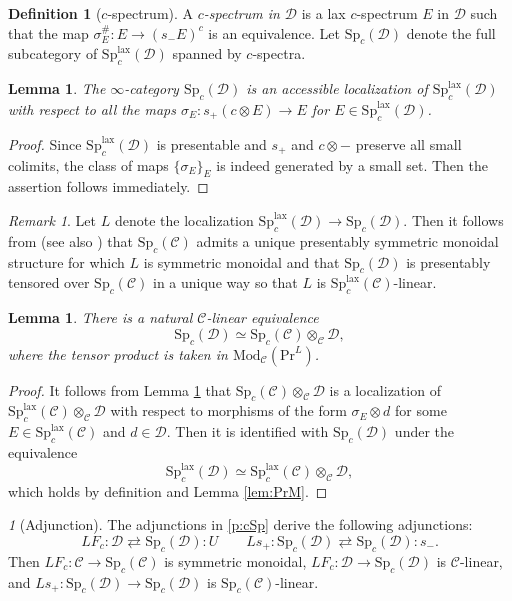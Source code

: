 \documentclass{amsart}
\theoremstyle{plain}
\newtheorem{lemma}[theorem]{Lemma}
\theoremstyle{definition}
\newtheorem{definition}[theorem]{Definition}
\theoremstyle{remark}
\newtheorem{remark}[theorem]{Remark}
\newtheorem{p}[theorem]{}
\numberwithin{equation}{theorem}
\newcommand{\mcal}[1]{\mathcal{#1}}
\newcommand{\Mod}{\mathrm{Mod}}
\renewcommand{\Pr}{\mathrm{Pr}}
\newcommand{\Sp}{\mathrm{Sp}}
\newcommand{\lax}{\mathrm{lax}}
\begin{document}
\begin{definition}[$c$-spectrum]\label{def:cSp2}
A \textit{$c$-spectrum in $\mcal{D}$} is a lax $c$-spectrum $E$ in $\mcal{D}$ such that the map $\sigma^\#_E\colon E\to(s_-E)^c$ is an equivalence.
Let $\Sp_c(\mcal{D})$ denote the full subcategory of $\Sp^\lax_c(\mcal{D})$ spanned by $c$-spectra.
\end{definition}

\begin{lemma}\label{lem:cSp3}
The $\infty$-category $\Sp_c(\mcal{D})$ is an accessible localization of $\Sp^\lax_c(\mcal{D})$ with respect to all the maps $\sigma_E\colon s_+(c\otimes E)\to E$ for $E\in\Sp^\lax_c(\mcal{D})$.
\end{lemma}
\begin{proof}
Since $\Sp^\lax_c(\mcal{D})$ is presentable and $s_+$ and $c\otimes-$ preserve all small colimits, the class of maps $\{\sigma_E\}_E$ is indeed generated by a small set.
Then the assertion follows immediately.
\end{proof}

\begin{remark}
Let $L$ denote the localization $\Sp^\lax_c(\mcal{D})\to\Sp_c(\mcal{D})$.
Then it follows from \cite[2.2.1.9]{HA} (see also \cite[4.1.7.4]{HA}) that $\Sp_c(\mcal{C})$ admits a unique presentably symmetric monoidal structure for which $L$ is symmetric monoidal and that $\Sp_c(\mcal{D})$ is presentably tensored over $\Sp_c(\mcal{C})$ in a unique way so that $L$ is $\Sp^\lax_c(\mcal{C})$-linear. 
\end{remark}

\begin{lemma}\label{lem:cSp+}
There is a natural $\mcal{C}$-linear equivalence
\[
	\Sp_c(\mcal{D}) \simeq \Sp_c(\mcal{C})\otimes_\mcal{C}\mcal{D},
\]
where the tensor product is taken in $\Mod_\mcal{C}(\Pr^L)$.
\end{lemma}
\begin{proof}
It follows from Lemma \ref{lem:cSp3} that $\Sp_c(\mcal{C})\otimes_\mcal{C}\mcal{D}$ is a localization of $\Sp^\lax_c(\mcal{C})\otimes_\mcal{C}\mcal{D}$ with respect to morphisms of the form $\sigma_E\otimes d$ for some $E\in\Sp^\lax_c(\mcal{C})$ and $d\in\mcal{D}$.
Then it is identified with $\Sp_c(\mcal{D})$ under the equivalence
\[
	\Sp^\lax_c(\mcal{D}) \simeq \Sp^\lax_c(\mcal{C})\otimes_\mcal{C}\mcal{D},
\]
which holds by definition and Lemma \ref{lem:PrM}.
\end{proof}

\begin{p}[Adjunction]\label{p:cSp2}
The adjunctions in \ref{p:cSp} derive the following adjunctions:
\[
	LF_c \colon \mcal{D} \rightleftarrows \Sp_c(\mcal{D}) \colon U \qquad
	Ls_+ \colon \Sp_c(\mcal{D}) \rightleftarrows \Sp_c(\mcal{D}) \colon s_-.
\]
Then $LF_c\colon\mcal{C}\to\Sp_c(\mcal{C})$ is symmetric monoidal, $LF_c\colon\mcal{D}\to\Sp_c(\mcal{D})$ is $\mcal{C}$-linear, and $Ls_+\colon\Sp_c(\mcal{D})\to\Sp_c(\mcal{D})$ is $\Sp_c(\mcal{C})$-linear.
\end{p}
\end{document}
